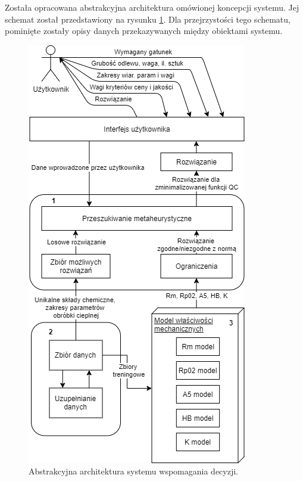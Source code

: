 Została opracowana abstrakcyjna architektura omówionej koncepcji systemu. Jej schemat został przedstawiony na rysunku \ref{fig:abst-arch}. Dla przejrzystości tego schematu, pominięte zostały opisy danych przekazywanych między obiektami systemu.
\begin{figure}[ht]{}
	\centering
	\includegraphics[scale=1]{images/system_wspomagania_decyzji-new.png}
	\caption {
		 Abstrakcyjna architektura systemu wspomagania decyzji.
	}
	\label{fig:abst-arch}
\end{figure}

\FloatBarrier

